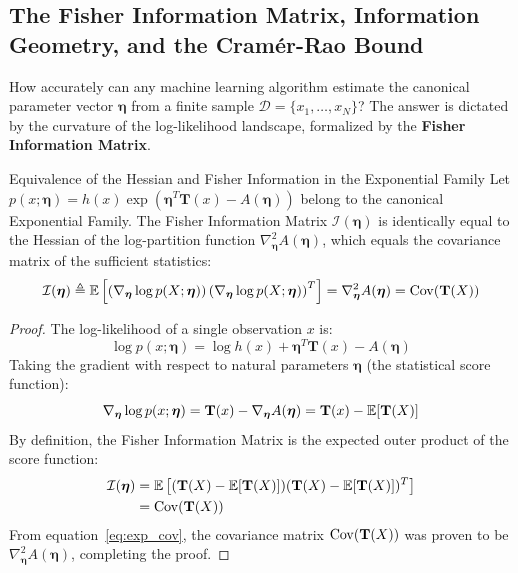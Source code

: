 \subsection{The Fisher Information Matrix, Information Geometry, and the Cramér-Rao Bound}
How accurately can any machine learning algorithm estimate the canonical parameter vector $\boldsymbol{\eta}$ from a finite sample $\mathcal{D} = \{x_1, \dots, x_N\}$? The answer is dictated by the curvature of the log-likelihood landscape, formalized by the \textbf{Fisher Information Matrix}.

\begin{theorembox}{Equivalence of the Hessian and Fisher Information in the Exponential Family}
Let $p(x; \boldsymbol{\eta}) = h(x)\exp(\boldsymbol{\eta}^T \mathbf{T}(x) - A(\boldsymbol{\eta}))$ belong to the canonical Exponential Family. The Fisher Information Matrix $\mathcal{I}(\boldsymbol{\eta})$ is identically equal to the Hessian of the log-partition function $\nabla_{\boldsymbol{\eta}}^2 A(\boldsymbol{\eta})$, which equals the covariance matrix of the sufficient statistics:
\begin{equation}
\mathcal{I}(\boldsymbol{\eta}) \triangleq \operatorname{\mathbb{E}}\left[ \left(\nabla_{\boldsymbol{\eta}} \log p(X; \boldsymbol{\eta})\right) \left(\nabla_{\boldsymbol{\eta}} \log p(X; \boldsymbol{\eta})\right)^T \right] = \nabla_{\boldsymbol{\eta}}^2 A(\boldsymbol{\eta}) = \operatorname{Cov}(\mathbf{T}(X))
\label{eq:fisher_equals_hessian}
\end{equation}
\end{theorembox}

\begin{proof}
The log-likelihood of a single observation $x$ is:
\begin{equation}
\log p(x; \boldsymbol{\eta}) = \log h(x) + \boldsymbol{\eta}^T \mathbf{T}(x) - A(\boldsymbol{\eta})
\end{equation}
Taking the gradient with respect to natural parameters $\boldsymbol{\eta}$ (the statistical score function):
\begin{equation}
\nabla_{\boldsymbol{\eta}} \log p(x; \boldsymbol{\eta}) = \mathbf{T}(x) - \nabla_{\boldsymbol{\eta}} A(\boldsymbol{\eta}) = \mathbf{T}(x) - \operatorname{\mathbb{E}}[\mathbf{T}(X)]
\end{equation}
By definition, the Fisher Information Matrix is the expected outer product of the score function:
\begin{align}
\mathcal{I}(\boldsymbol{\eta}) &= \operatorname{\mathbb{E}}\left[ (\mathbf{T}(X) - \operatorname{\mathbb{E}}[\mathbf{T}(X)]) (\mathbf{T}(X) - \operatorname{\mathbb{E}}[\mathbf{T}(X)])^T \right] \nonumber \\
&= \operatorname{Cov}(\mathbf{T}(X))
\end{align}
From equation~\eqref{eq:exp_cov}, the covariance matrix $\operatorname{Cov}(\mathbf{T}(X))$ was proven to be $\nabla_{\boldsymbol{\eta}}^2 A(\boldsymbol{\eta})$, completing the proof.
\end{proof}

